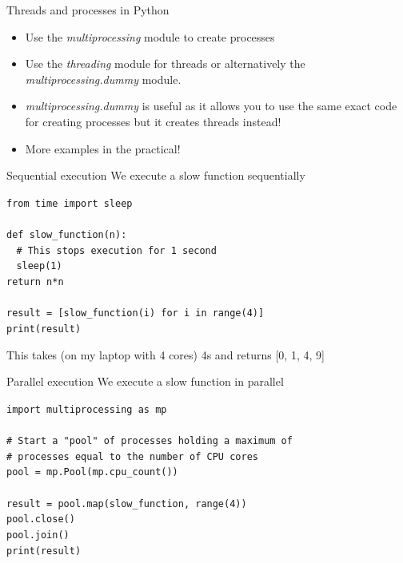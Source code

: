\documentclass[9pt, aspectratio=169]{beamer}
\begin{document}
\begin{frame}
	{Threads and processes in Python}

	\begin{itemize}
		\item Use the \textit{multiprocessing} module to create processes
		\item Use the \textit{threading} module for threads or alternatively the \textit{multiprocessing.dummy} module.
		\item \textit{multiprocessing.dummy} is useful as it allows you to use the same exact code for creating processes but it creates threads instead!
		\item More examples in the practical!
	\end{itemize}
\end{frame}

\begin{frame}
	{Sequential execution}
	We execute a slow function sequentially
	\begin{codebox}
		\texttt{from time import sleep\\
		\\
		def slow\_function(n):\\
		$~~~~$\# This stops execution for 1 second\\
		$~~~~$sleep(1)\\
		return n*n\\
		\\
		result = [slow\_function(i) for i in range(4)]\\
		print(result)}
	\end{codebox}

	This takes (on my laptop with 4 cores) 4s and returns [0, 1, 4, 9]
\end{frame}

\begin{frame}
	{Parallel execution}
	We execute a slow function in parallel

	\begin{codebox}
		\texttt{import multiprocessing as mp\\			
			\\
			\# Start a "pool" of processes holding a maximum of\\
			\# processes equal to the number of CPU cores\\
			pool = mp.Pool(mp.cpu\_count())\\
			\\
			result = pool.map(slow\_function, range(4))\\
			pool.close()\\
			pool.join()\\
			print(result)
		}
	\end{codebox}

\end{frame}
\end{document}

